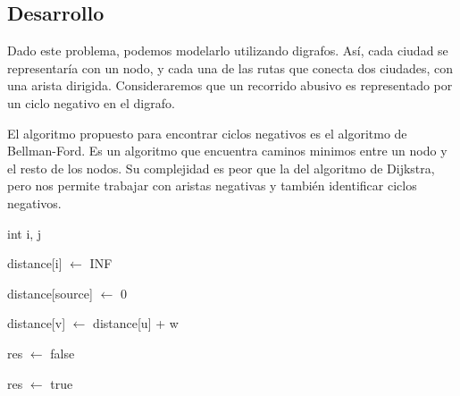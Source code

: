 \subsection{Desarrollo}
Dado este problema, podemos modelarlo utilizando digrafos. Así, cada ciudad se representaría con un nodo, y cada una de las rutas que conecta dos ciudades, con una arista dirigida. Consideraremos que un recorrido abusivo es representado por un ciclo negativo en el digrafo.
\\
\par
El algoritmo propuesto para encontrar ciclos negativos es el algoritmo de Bellman-Ford. Es un algoritmo que encuentra caminos minimos entre un nodo y el resto de los nodos. Su complejidad es peor que la del algoritmo de Dijkstra, pero nos permite trabajar con aristas negativas y también identificar ciclos negativos. 
\\
\par
\begin{algorithm}[H]
		\NoCaptionOfAlgo
		\caption{}
		
		int i, j
		
		\For{i in [0..n)}
		{
			distance[i] $\leftarrow$ INF
		}
		
		distance[source] $\leftarrow$ 0
		
		\For{i in [0..n)}
		{
			{
				{
					distance[v] $\leftarrow$ distance[u] + w
				}
				
			}
		}

		res $\leftarrow$ false
		
			{
				{
					res $\leftarrow$ true
				}
				
			}

	\end{algorithm}

